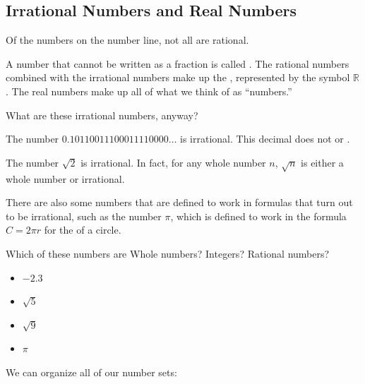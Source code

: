 \subsection{Irrational Numbers and Real Numbers}
Of the numbers on the number line, not all are rational.
\begin{definition}
A number that cannot be written as a fraction is called . The rational numbers combined with the irrational numbers make up the , represented by the symbol $\mathbb{R}$. The real numbers make up all of what we think of as ``numbers.''
\end{definition}
What are these irrational numbers, anyway?
\begin{Example}
The number $0.10110011100011110000\dots$ is irrational. This decimal does not \makeblank[1in] or \makeblank[1in].
\end{Example}
\begin{Example}
The number $\sqrt{2}$ is irrational. In fact, for any whole number $n$, $\sqrt{n}$ is either a whole number or irrational.
\end{Example}
\begin{Example}There are also some numbers that are defined to work in formulas that turn out to be irrational, such as the number $\pi$, which is defined to work in the formula $C=2\pi r$ for the \makeblank of a circle.
\end{Example}
\begin{Example}
Which of these numbers are Whole numbers? Integers? Rational numbers?
\begin{itemize}
\item $-2.3$   
\makeblanknew
\item $\sqrt{5}$   
\makeblanknew
\item $\sqrt{9}$   
\makeblanknew
\item $\pi$   
\makeblanknew
\end{itemize}
\end{Example}
We can organize all of our number sets:
\begin{center}
\end{center}